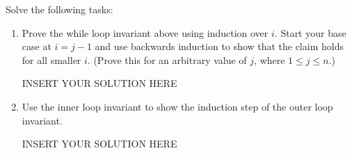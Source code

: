 Solve the following tasks:
\begin{enumerate}
	\item Prove the while loop invariant above using induction over $i$. Start your base case at $i=j-1$ and use backwards induction to show that the claim holds for all smaller $i$. (Prove this for an arbitrary value of $j$,
 where $1 \leq j \leq n$.)
	
\begin{solution}   INSERT YOUR SOLUTION HERE   \end{solution}
	
	\item Use the inner loop invariant to show the induction step of the outer loop invariant.
	
\begin{solution}   INSERT YOUR SOLUTION HERE   \end{solution}
	
\end{enumerate}

